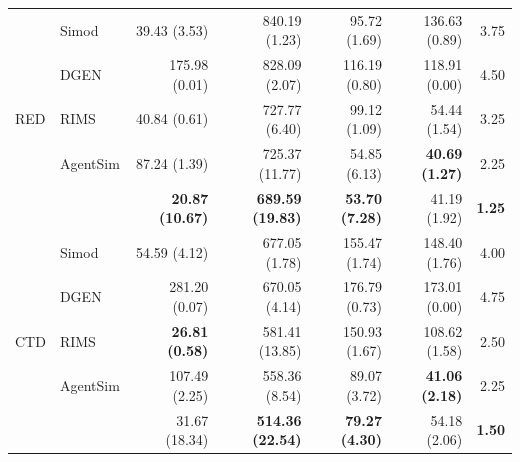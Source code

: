 \begin{table}[t]
\begin{tabular}{llrrrrr}
\midrule
\multirow{5}{*}{RED} & Simod & 39.43 (3.53) & 840.19 (1.23) & 95.72 (1.69) & 136.63 (0.89) & 3.75 \\
 & DGEN & 175.98 (0.01) & 828.09 (2.07) & 116.19 (0.80) & 118.91 (0.00) & 4.50 \\
 & RIMS & 40.84 (0.61) & 727.77 (6.40) & 99.12 (1.09) & 54.44 (1.54) & 3.25 \\
 & AgentSim & 87.24 (1.39) & 725.37 (11.77) & 54.85 (6.13) & \textbf{40.69 (1.27)} & 2.25 \\
 & \tool{} & \textbf{20.87 (10.67)} & \textbf{689.59 (19.83)} & \textbf{53.70 (7.28)} & 41.19 (1.92) & \textbf{1.25} \\
\midrule
\multirow{5}{*}{CTD} & Simod & 54.59 (4.12) & 677.05 (1.78) & 155.47 (1.74) & 148.40 (1.76) & 4.00 \\
 & DGEN & 281.20 (0.07) & 670.05 (4.14) & 176.79 (0.73) & 173.01 (0.00) & 4.75 \\
 & RIMS & \textbf{26.81 (0.58)} & 581.41 (13.85) & 150.93 (1.67) & 108.62 (1.58) & 2.50 \\
 & AgentSim & 107.49 (2.25) & 558.36 (8.54) & 89.07 (3.72) & \textbf{41.06 (2.18)} & 2.25 \\
 & \tool{} & 31.67 (18.34) & \textbf{514.36 (22.54)} & \textbf{79.27 (4.30)} & 54.18 (2.06) & \textbf{1.50} \\
\bottomrule
\end{tabular}
\end{table}